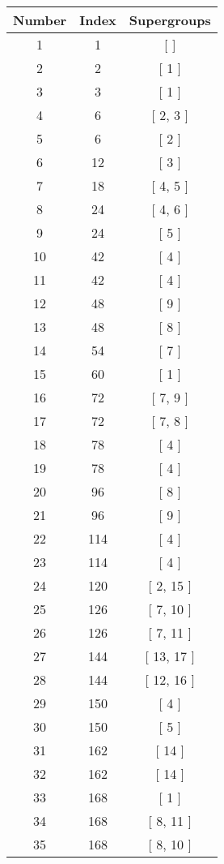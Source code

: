 \begin{center}
\begin{longtable}[H]{|| c c c ||}
\hline
Number & Index & Supergroups \\ 
\hline
1 & 1 & [ ] \\ 
\hline
2 & 2 & [ 1 ] \\ 
\hline
3 & 3 & [ 1 ] \\ 
\hline
4 & 6 & [ 2, 3 ] \\ 
\hline
5 & 6 & [ 2 ] \\ 
\hline
6 & 12 & [ 3 ] \\ 
\hline
7 & 18 & [ 4, 5 ] \\ 
\hline
8 & 24 & [ 4, 6 ] \\ 
\hline
9 & 24 & [ 5 ] \\ 
\hline
10 & 42 & [ 4 ] \\ 
\hline
11 & 42 & [ 4 ] \\ 
\hline
12 & 48 & [ 9 ] \\ 
\hline
13 & 48 & [ 8 ] \\ 
\hline
14 & 54 & [ 7 ] \\ 
\hline
15 & 60 & [ 1 ] \\ 
\hline
16 & 72 & [ 7, 9 ] \\ 
\hline
17 & 72 & [ 7, 8 ] \\ 
\hline
18 & 78 & [ 4 ] \\ 
\hline
19 & 78 & [ 4 ] \\ 
\hline
20 & 96 & [ 8 ] \\ 
\hline
21 & 96 & [ 9 ] \\ 
\hline
22 & 114 & [ 4 ] \\ 
\hline
23 & 114 & [ 4 ] \\ 
\hline
24 & 120 & [ 2, 15 ] \\ 
\hline
25 & 126 & [ 7, 10 ] \\ 
\hline
26 & 126 & [ 7, 11 ] \\ 
\hline
27 & 144 & [ 13, 17 ] \\ 
\hline
28 & 144 & [ 12, 16 ] \\ 
\hline
29 & 150 & [ 4 ] \\ 
\hline
30 & 150 & [ 5 ] \\ 
\hline
31 & 162 & [ 14 ] \\ 
\hline
32 & 162 & [ 14 ] \\ 
\hline
33 & 168 & [ 1 ] \\ 
\hline
34 & 168 & [ 8, 11 ] \\ 
\hline
35 & 168 & [ 8, 10 ] \\ 
\hline

\end{longtable}
\end{center}
